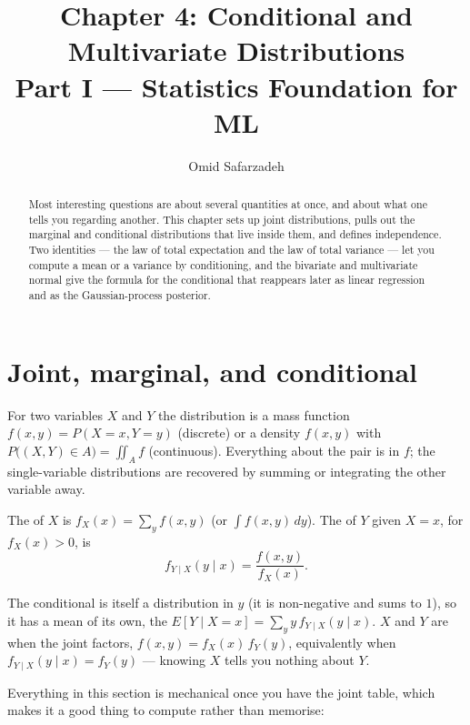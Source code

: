 \documentclass[11pt]{article}
\title{Chapter 4: Conditional and Multivariate Distributions \\ \large Part I --- Statistics Foundation for ML}
\author{Omid Safarzadeh}
\date{}
\begin{document}
\maketitle

\begin{abstract}
\noindent
Most interesting questions are about several quantities at once, and about
what one tells you regarding another. This chapter sets up joint
distributions, pulls out the marginal and conditional distributions that
live inside them, and defines independence. Two identities --- the law of
total expectation and the law of total variance --- let you compute a mean
or a variance by conditioning, and the bivariate and multivariate normal
give the formula for the conditional that reappears later as linear
regression and as the Gaussian-process posterior.
\end{abstract}

\tableofcontents

\section{Joint, marginal, and conditional}

For two variables $X$ and $Y$ the  distribution is a mass
function $f(x,y) = P(X=x, Y=y)$ (discrete) or a density $f(x,y)$ with
$P\big((X,Y)\in A\big) = \iint_A f$ (continuous). Everything about the pair
is in $f$; the single-variable distributions are recovered by summing or
integrating the other variable away.

\begin{definition}
The  of $X$ is
$f_X(x) = \sum_y f(x,y)$ (or $\int f(x,y)\,dy$). The  of
$Y$ given $X=x$, for $f_X(x) > 0$, is
\[
  f_{Y\mid X}(y \mid x) = \frac{f(x,y)}{f_X(x)}.
\]
\end{definition}

The conditional is itself a distribution in $y$ (it is non-negative and sums
to $1$), so it has a mean of its own, the 
$E[Y \mid X = x] = \sum_y y\, f_{Y\mid X}(y\mid x)$. $X$ and $Y$ are
 when the joint factors, $f(x,y) = f_X(x)\,f_Y(y)$,
equivalently when $f_{Y\mid X}(y\mid x) = f_Y(y)$ --- knowing $X$ tells you
nothing about $Y$.

Everything in this section is mechanical once you have the joint table, which
makes it a good thing to compute rather than memorise:
\end{document}
